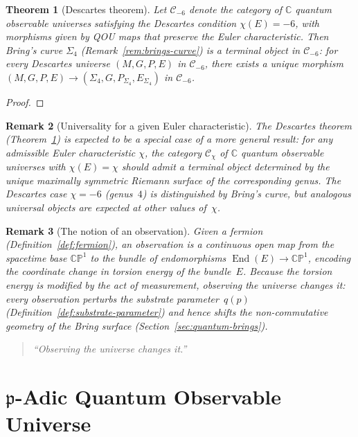 \documentclass[12pt,a4paper]{report}
\newtheorem{theorem}{Theorem}[chapter]
\newtheorem{remark}[theorem]{Remark}
\newcommand{\pp}{\mathfrak{p}}
\begin{document}
\begin{theorem}[Descartes theorem]
\label{thm:descartes}
Let $\mathcal{C}_{-6}$ denote the category of $\mathbb{C}$ quantum
observable universes satisfying the Descartes condition $\chi(E) = -6$,
with morphisms given by QOU maps that preserve the Euler characteristic.
Then Bring's curve $\Sigma_4$ (Remark~\ref{rem:brings-curve}) is a terminal
object in $\mathcal{C}_{-6}$: for every Descartes universe $(M, G, P, E)$ in
$\mathcal{C}_{-6}$, there exists a unique morphism
$(M, G, P, E) \to (\Sigma_4, G, P_{\Sigma_4}, E_{\Sigma_4})$ in $\mathcal{C}_{-6}$.
\end{theorem}

\begin{proof}
\end{proof}

\begin{remark}[Universality for a given Euler characteristic]
\label{rem:universality-general}
The Descartes theorem (Theorem~\ref{thm:descartes}) is expected to be a
special case of a more general result: for any admissible Euler
characteristic $\chi$, the category $\mathcal{C}_{\chi}$ of $\mathbb{C}$
quantum observable universes with $\chi(E) = \chi$ should admit a terminal
object determined by the unique maximally symmetric Riemann surface of the
corresponding genus.  The Descartes case $\chi = -6$ (genus~$4$) is
distinguished by Bring's curve, but analogous universal objects are expected
at other values of~$\chi$.
\end{remark}

\begin{remark}[The notion of an observation]
\label{rem:observation}
Given a fermion (Definition~\ref{def:fermion}), an \emph{observation}
is a continuous open map from the spacetime base $\mathbb{CP}^1$ to
the bundle of endomorphisms
$\operatorname{End}(E)\to\mathbb{CP}^1$, encoding the coordinate
change in torsion energy of the bundle~$E$.  Because the torsion
energy is modified by the act of measurement, observing the universe
changes it: every observation perturbs the substrate parameter~$q(p)$
(Definition~\ref{def:substrate-parameter}) and hence shifts the
non-commutative geometry of the Bring surface
(Section~\ref{sec:quantum-brings}).

\smallskip
\begin{quote}
\itshape ``Observing the universe changes it.''
\end{quote}
\end{remark}

 \chapter{\texorpdfstring{$\pp$}{p}-Adic Quantum Observable Universe}
\label{chap:p-adic}
\end{document}
